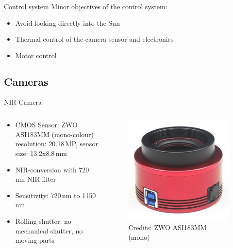 \documentclass[11pt, aspectratio=169]{beamer}
\begin{document}
\begin{frame}[t]{Control system}
Minor objectives of the control system:
\begin{itemize}
	\item Avoid looking directly into the Sun
	\item Thermal control of the camera sensor and electronics
	\item Motor control
\end{itemize}

\end{frame}

\subsection{Cameras} 			%
\begin{frame}{NIR Camera}
\begin{columns}[t]
\begin{column}{0.6\textwidth}
	\begin{itemize}
		\item CMOS Sensor: ZWO ASI183MM (mono-colour) \\
			resolution: 20.18\,MP, sensor size: 13.2x8.8\,mm
		\item NIR-conversion with 720\,nm NIR filter
		\item Sensitivity: 720\,nm to 1150\,nm
		\item Rolling shutter: no mechanical shutter, no moving parts
	\end{itemize}
\end{column}
\begin{column}{0.4\textwidth}
	\begin{figure}[t]
		\centering
		\includegraphics[width=0.7\linewidth]{figures/images/ZWO_ASI183MM.jpg}
		\caption*{Credits: ZWO ASI183MM (mono)}
		\label{fig::NIR_sensor}
	\end{figure}
\end{column}
\end{columns}
\end{frame}
\end{document}
